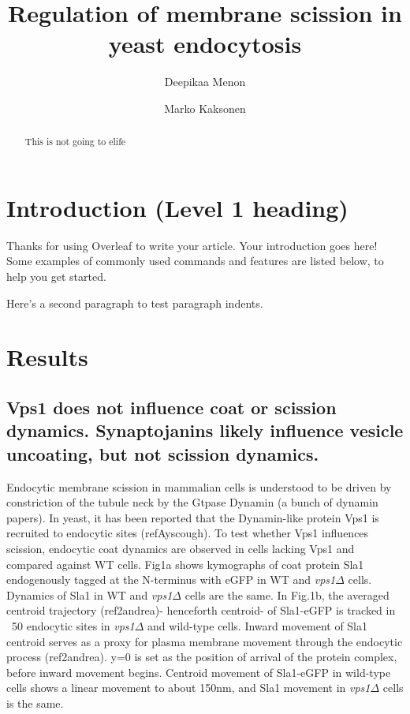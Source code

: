\documentclass[9pt,lineno]{elife}
\title{Regulation of membrane scission in yeast endocytosis}
\author[1]{Deepikaa Menon}
\author[1*]{Marko Kaksonen}
\affil[1]{Department of Biochemistry, University of Geneva, Geneva, Switzerland}
\begin{document}
\maketitle

\begin{abstract}
This is not going to elife
\end{abstract}


\section{Introduction (Level 1 heading)}

Thanks for using Overleaf to write your article. Your introduction goes here! Some examples of commonly used commands and features are listed below, to help you get started.

Here's a second paragraph to test paragraph indents. \lipsum[1]


\section{Results}
\subsection{Vps1 does not influence coat or scission dynamics. Synaptojanins likely influence vesicle uncoating, but not scission dynamics.}

Endocytic membrane scission in mammalian cells is understood to be driven by constriction of the tubule neck by the Gtpase Dynamin (a bunch of dynamin papers). In yeast, it has been reported that the Dynamin-like protein Vps1 is recruited to endocytic sites (refAyscough). To test whether Vps1 influences scission, endocytic coat dynamics are observed in cells lacking Vps1 and compared against WT cells. Fig1a shows kymographs of coat protein Sla1 endogenously tagged at the N-terminus with eGFP in WT and \textit{vps1$\Delta$} cells. Dynamics of Sla1 in WT and \textit{vps1$\Delta$} cells are the same. In Fig.1b, the averaged centroid trajectory (ref2andrea)- henceforth centroid- of Sla1-eGFP is tracked in ~50 endocytic sites in \textit{vps1$\Delta$} and wild-type cells. Inward movement of Sla1 centroid serves as a proxy for plasma membrane movement through the endocytic process (ref2andrea). y=0 is set as the position of arrival of the protein complex, before inward movement begins. Centroid movement of Sla1-eGFP in wild-type cells shows a linear movement to about 150nm, and Sla1 movement in \textit{vps1$\Delta$} cells is the same. 
\end{document}
